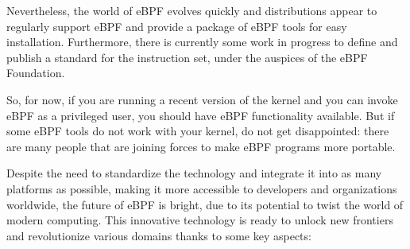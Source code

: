Nevertheless, the world of eBPF evolves quickly and distributions appear to regularly support eBPF and provide a package of eBPF tools for easy installation. 
Furthermore, there is currently some work in progress to define and publish a standard for the instruction set, under the auspices of the eBPF Foundation.

So, for now, if you are running a recent version of the kernel and you can invoke eBPF as a privileged user, you should have eBPF functionality available.
But if some eBPF tools do not work with your kernel, do not get disappointed: there are many people that are joining forces to make eBPF programs more portable.

Despite the need to standardize the technology and integrate it into as many platforms as possible, making it more accessible to developers and organizations worldwide, the future of eBPF is bright, due to its potential to twist the world of modern computing.
This innovative technology is ready to unlock new frontiers and revolutionize various domains thanks to some key aspects:

